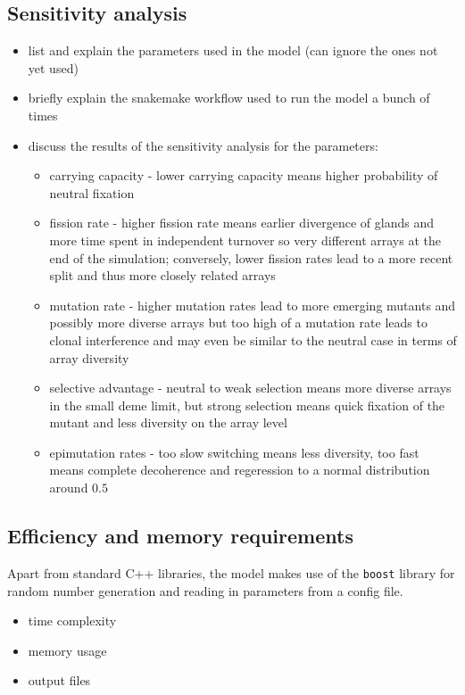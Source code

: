 \subsection{Sensitivity analysis}
\begin{itemize}
    \item list and explain the parameters used in the model (can ignore the ones not yet used)
    \item briefly explain the snakemake workflow used to run the model a bunch of times
    \item discuss the results of the sensitivity analysis for the parameters:
    \begin{itemize}
        \item carrying capacity - lower carrying capacity means higher probability of neutral
            fixation
        \item fission rate - higher fission rate means earlier divergence of glands and more
            time spent in independent turnover so very different arrays at the end of the
            simulation; conversely, lower fission rates lead to a more recent split and thus
            more closely related arrays
        \item mutation rate - higher mutation rates lead to more emerging mutants and possibly
            more diverse arrays but too high of a mutation rate leads to clonal interference
            and may even be similar to the neutral case in terms of array diversity
        \item selective advantage - neutral to weak selection means more diverse arrays in the
            small deme limit, but strong selection means quick fixation of the mutant and less
            diversity on the array level
        \item epimutation rates - too slow switching means less diversity, too fast means
            complete decoherence and regeression to a normal distribution around $0.5$
    \end{itemize}
\end{itemize}

\subsection{Efficiency and memory requirements}
Apart from standard C++ libraries, the model makes use of the \texttt{boost} library for random number
generation and reading in parameters from a config file.
\begin{itemize}
    \item time complexity
    \item memory usage
    \item output files
\end{itemize}


